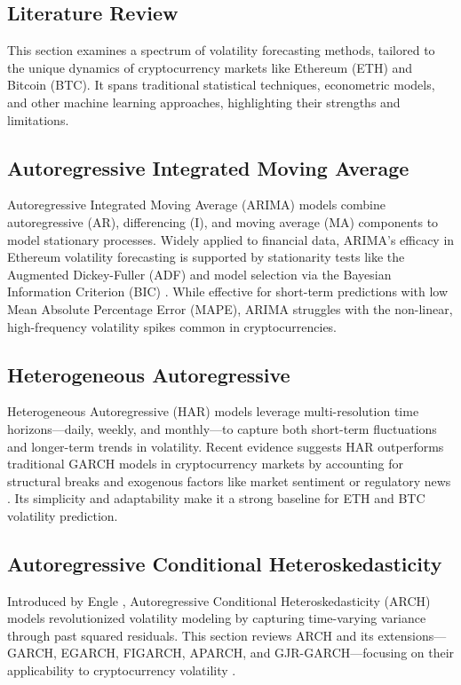 \documentclass[9pt]{article}
\begin{document}
	\begin{multicols}{2}
		\section{Literature Review}
		\label{sec:litreview}
		
		This section examines a spectrum of volatility forecasting methods, tailored to the unique dynamics of cryptocurrency markets like Ethereum (ETH) and Bitcoin (BTC). It spans traditional statistical techniques, econometric models, and other machine learning approaches, highlighting their strengths and limitations.
		
		\subsection{Autoregressive Integrated Moving Average}
		Autoregressive Integrated Moving Average (ARIMA) models combine autoregressive (AR), differencing (I), and moving average (MA) components to model stationary processes. Widely applied to financial data, ARIMA’s efficacy in Ethereum volatility forecasting is supported by stationarity tests like the Augmented Dickey-Fuller (ADF) and model selection via the Bayesian Information Criterion (BIC) \citep{hyndman2018}. While effective for short-term predictions with low Mean Absolute Percentage Error (MAPE), ARIMA struggles with the non-linear, high-frequency volatility spikes common in cryptocurrencies.
		
		\subsection{Heterogeneous Autoregressive}
		Heterogeneous Autoregressive (HAR) models leverage multi-resolution time horizons—daily, weekly, and monthly—to capture both short-term fluctuations and longer-term trends in volatility. Recent evidence suggests HAR outperforms traditional GARCH models in cryptocurrency markets by accounting for structural breaks and exogenous factors like market sentiment or regulatory news \citep{clements2021}. Its simplicity and adaptability make it a strong baseline for ETH and BTC volatility prediction.
		
		\subsection{Autoregressive Conditional Heteroskedasticity}
		Introduced by Engle \citep{engle1982}, Autoregressive Conditional Heteroskedasticity (ARCH) models revolutionized volatility modeling by capturing time-varying variance through past squared residuals. This section reviews ARCH and its extensions—GARCH, EGARCH, FIGARCH, APARCH, and GJR-GARCH—focusing on their applicability to cryptocurrency volatility \citep{bollerslev2010}.
		

\end{multicols}
\end{document}
